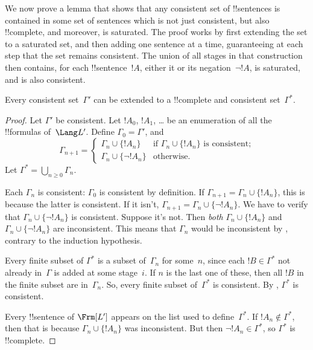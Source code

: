 \documentclass[../../../include/open-logic-section]{subfiles}
\begin{document}

We now prove a lemma that shows that any consistent set of
!!{sentence}s is contained in some set of sentences which is not just
consistent, but also !!{complete}, and moreover, is saturated. The
proof works by first extending the set to a saturated set, and then
adding one sentence at a time, guaranteeing at each step that the set
remains consistent. The union of all stages in that construction then
contains, for each !!{sentence}~$!A$, either it or its negation~$\lnot
!A$, is saturated, and is also consistent.

\begin{lem}
 Every consistent set~$\Gamma'$ can be extended
to a !!{complete} and consistent set~$\Gamma^*$.
\end{lem}

\begin{proof}
Let $\Gamma'$ be consistent.  Let $!A_0$, $!A_1$, \dots{}
be an enumeration of all the !!{formula}s of~$\Lang L'$.  Define
$\Gamma_0 = \Gamma'$, and
\[
\Gamma_{n+1} =
\begin{cases}
\Gamma_n \cup \{ !A_n \} & \textrm{if $\Gamma_n \cup \{!A_n\}$ is
  consistent;} \\
\Gamma_n \cup \{ \lnot !A_n \} & \textrm{otherwise.}
\end{cases}
\]
Let $\Gamma^* = \bigcup_{n \geq 0} \Gamma_n$.

Each $\Gamma_n$ is consistent: $\Gamma_0$ is consistent by definition.
If $\Gamma_{n+1} = \Gamma_n \cup \{!A_n\}$, this is because the latter
is consistent.  If it isn't, $\Gamma_{n+1} = \Gamma_n \cup \{\lnot
!A_n\}$. We have to verify that $\Gamma_n \cup \{\lnot !A_n\}$ is
consistent. Suppose it's not. Then \emph{both} $\Gamma_n \cup
\{!A_n\}$ and $\Gamma_n \cup \{\lnot !A_n\}$ are inconsistent.  This
means that $\Gamma_n$ would be inconsistent by
,
contrary to the induction hypothesis.

Every finite subset of $\Gamma^*$ is a subset of~$\Gamma_n$ for
some~$n$, since each $!B \in \Gamma^*$ not already in~$\Gamma$ is
added at some stage~$i$. If $n$ is the last one of these, then all
$!B$ in the finite subset are in~$\Gamma_n$. So, every finite subset
of~$\Gamma^*$ is consistent. By
,
$\Gamma^*$ is consistent.

Every !!{sentence} of $\Frm[L']$ appears on the list used to
define~$\Gamma^*$. If $!A_n \notin \Gamma^*$, then that is because
$\Gamma_n \cup \{!A_n\}$ was inconsistent.  But then $\lnot !A_n
\in \Gamma^*$, so $\Gamma^*$ is !!{complete}.
\end{proof}
\end{document}
